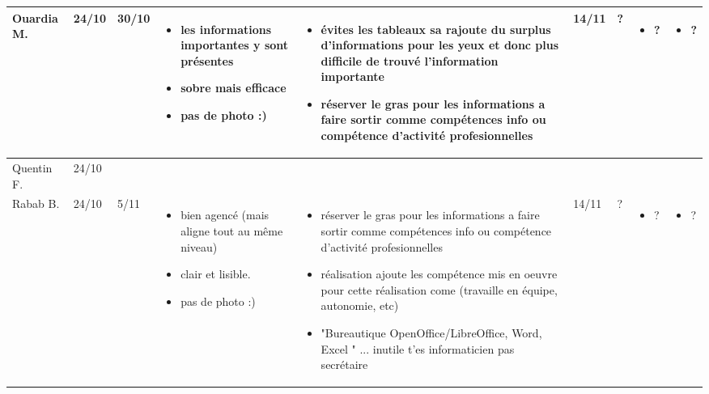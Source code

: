 \documentclass[a4paper,11pt]{article}
\begin{document}
\begin{landscape}
\begin{longtable}{|l|l|l|p{4cm}|p{4cm}|l|l|p{4cm}|p{4cm}|}
    Ouardia M.  & 24/10 & 30/10
		& \begin{itemize}
		\item les informations importantes y sont présentes
		\item sobre mais efficace
		\item pas de photo :)
		\end{itemize}
		& \begin{itemize}
		\item évites les tableaux sa rajoute du surplus d'informations pour les yeux et donc plus difficile de trouvé l'information importante
		\item réserver le gras pour les informations a faire sortir comme compétences info ou compétence d'activité profesionnelles
		\end{itemize}
		&  14/11 & ? 
		& \begin{itemize}
		  \item ?
		  \end{itemize}
		& \begin{itemize}
		  \item ?
		  \end{itemize} \\ \hline

    Quentin F. & 24/10 & & & & & & & \\ \hline

    Rabab B.  & 24/10 & 5/11
	      & \begin{itemize}
		\item bien agencé (mais aligne tout au même niveau)
		\item clair et lisible.
		\item pas de photo :)
		\end{itemize}
	      & \begin{itemize}
		\item réserver le gras pour les informations a faire sortir comme compétences info ou compétence d'activité profesionnelles
		\item réalisation ajoute les compétence mis en oeuvre pour cette réalisation come (travaille en équipe, autonomie, etc)
		\item "Bureautique  OpenOffice/LibreOffice, Word, Excel " ... inutile t'es informaticien pas secrétaire
		\end{itemize}
	      & 14/11 & ?
	      & \begin{itemize}
		\item ?
		\end{itemize}
	      & \begin{itemize}
		\item ?
		\end{itemize} \\ \hline


\end{longtable}
\end{landscape}
\end{document}
